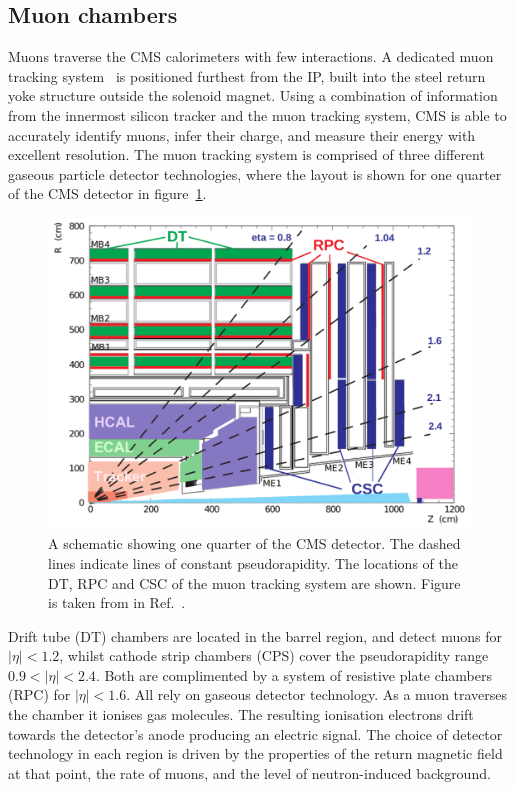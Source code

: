 \subsection{Muon chambers}\label{sec:cms_muon}
Muons traverse the CMS calorimeters with few interactions. A dedicated muon tracking system~\cite{} is positioned furthest from the IP, built into the steel return yoke structure outside the solenoid magnet. Using a combination of information from the innermost silicon tracker and the muon tracking system, CMS is able to accurately identify muons, infer their charge, and measure their energy with excellent resolution. The muon tracking system is comprised of three different gaseous particle detector technologies, where the layout is shown for one quarter of the CMS detector in figure~\ref{fig:cms_muon}. 

\begin{figure}[htb!]
  \centering
  \includegraphics[width=.6\textwidth]{Figures/cms/muon.pdf}
  \caption[The CMS hadronic calorimeter]
  {
    A schematic showing one quarter of the CMS detector. The dashed lines indicate lines of constant pseudorapidity. The locations of the DT, RPC and CSC of the muon tracking system are shown. Figure is taken from in Ref.~\cite{Chatrchyan:2012xi}.
  }
  \label{fig:cms_muon}
\end{figure}

Drift tube (DT) chambers are located in the barrel region, and detect muons for $|\eta|<1.2$, whilst cathode strip chambers (CPS) cover the pseudorapidity range $0.9<|\eta|<2.4$. Both are complimented by a system of resistive plate chambers (RPC) for $|\eta|<1.6$. All rely on gaseous detector technology. As a muon traverses the chamber it ionises gas molecules. The resulting ionisation electrons drift towards the detector's anode producing an electric signal. The choice of detector technology in each region is driven by the properties of the return magnetic field at that point, the rate of muons, and the level of neutron-induced background.

